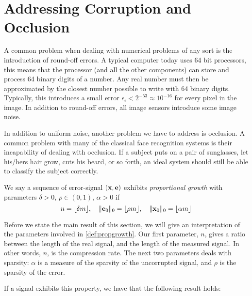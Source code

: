 \section{Addressing Corruption and Occlusion}
A common problem when dealing with numerical problems of any sort is the introduction of round-off errors. A typical computer today uses 64 bit processors, this means that the processor (and all the other components) can store and process 64 binary digits of a number. Any real number must then be approximated by the closest number possible to write with 64 binary digits. Typically, this introduces a small error $ \epsilon_{i} < 2^{-53} \approx 10^{-16} $ for every pixel in the image. In addition to round-off errors, all image sensors introduce some image noise. 

In addition to uniform noise, another problem we have to address is occlusion. A common problem with many of the classical face recognition systems is their incapability of dealing with occlusion. If a subject puts on a pair of sunglasses, let his/hers hair grow, cuts his beard, or so forth, an ideal system should still be able to classify the subject correctly.


\begin{definition}
	\label{def:propgrowth}
	We say a sequence of error-signal $ (\mathbf{x}, \mathbf{e}) $ exhibits \textit{proportional growth} with parameters $ \delta > 0 $, $ \rho \in (0,1) $, $ \alpha > 0 $ if	
	\[
		n = \lfloor \delta m \rfloor,\quad \lVert\mathbf{e}_{0}\rVert_{0} = \lfloor \rho m \rfloor, \quad \lVert\mathbf{x}_{0}\rVert_{0} = \lfloor \alpha m \rfloor
	\]
\end{definition}

Before we state the main result of this section, we will give an interpretation of the parameters involved in \cref{def:propgrowth}. Our first parameter, $ n $, gives a ratio between the length of the real signal, and the length of the measured signal. In other words, $ n $, is the compression rate. The next two parameters deals with sparsity: $ \alpha $ is a measure of the sparsity of the uncorrupted signal, and $ \rho $ is the sparsity of the error. 

If a signal exhibits this property, we have that the following result holds:

